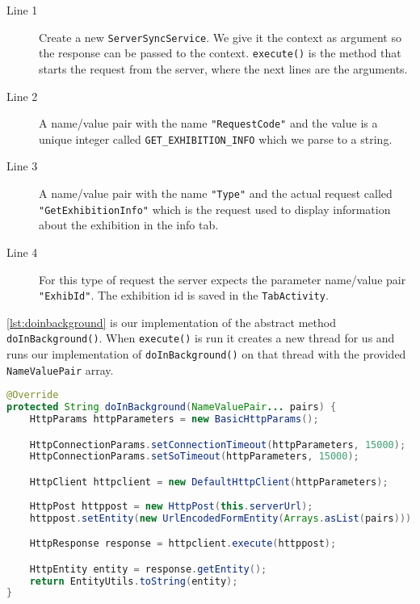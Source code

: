 \begin{description}
\item[Line 1] Create a new \lstinline|ServerSyncService|. We give it the context as argument so the response can be passed to the context. \lstinline|execute()| is the method that starts the request from the server, where the next lines are the arguments.
\item[Line 2] A name/value pair with the name \lstinline|"RequestCode"| and the value is a unique integer called \lstinline|GET_EXHIBITION_INFO| which we parse to a string.
\item[Line 3] A name/value pair with the name \lstinline|"Type"| and the actual request called \lstinline|"GetExhibitionInfo"| which is the request used to display information about the exhibition in the info tab.
\item[Line 4] For this type of request the server expects the parameter name/value pair \lstinline|"ExhibId"|. The exhibition id is saved in the \lstinline|TabActivity|.
\end{description}
\autoref{lst:doinbackground} is our implementation of the abstract method \lstinline|doInBackground()|. When \lstinline|execute()| is run it creates a new thread for us and runs our implementation of \lstinline|doInBackground()| on that thread with the provided \lstinline|NameValuePair| array.

\begin{lstlisting}[language=java, label=lst:doinbackground, caption={The async abstract method \lstinline|doInBackground()|}]
@Override
protected String doInBackground(NameValuePair... pairs) {
    HttpParams httpParameters = new BasicHttpParams();

    HttpConnectionParams.setConnectionTimeout(httpParameters, 15000);
    HttpConnectionParams.setSoTimeout(httpParameters, 15000);

    HttpClient httpclient = new DefaultHttpClient(httpParameters);
    
    HttpPost httppost = new HttpPost(this.serverUrl);
    httppost.setEntity(new UrlEncodedFormEntity(Arrays.asList(pairs)));

    HttpResponse response = httpclient.execute(httppost);

    HttpEntity entity = response.getEntity();
    return EntityUtils.toString(entity);
}
\end{lstlisting}

